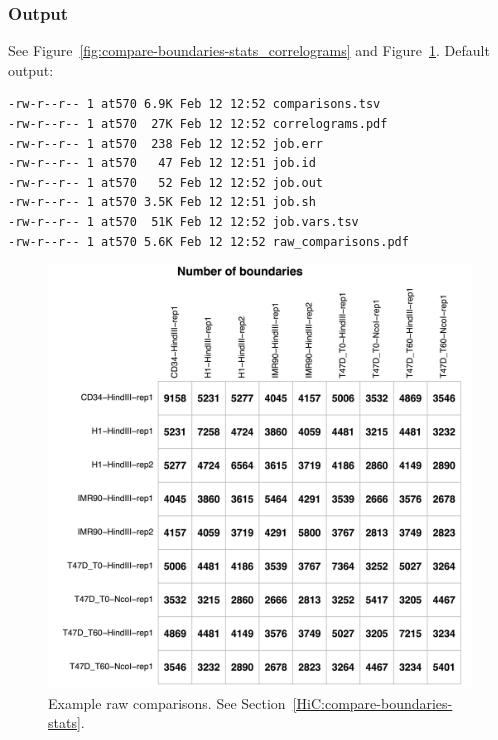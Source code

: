 \subsubsection{Output} %
See Figure~\ref{fig:compare-boundaries-stats_correlograms} and Figure~\ref{fig:compare-boundaries-stats_raw_comparisons}. Default output:
\begin{lstlisting}
-rw-r--r-- 1 at570 6.9K Feb 12 12:52 comparisons.tsv
-rw-r--r-- 1 at570  27K Feb 12 12:52 correlograms.pdf
-rw-r--r-- 1 at570  238 Feb 12 12:52 job.err
-rw-r--r-- 1 at570   47 Feb 12 12:51 job.id
-rw-r--r-- 1 at570   52 Feb 12 12:52 job.out
-rw-r--r-- 1 at570 3.5K Feb 12 12:51 job.sh
-rw-r--r-- 1 at570  51K Feb 12 12:52 job.vars.tsv
-rw-r--r-- 1 at570 5.6K Feb 12 12:52 raw_comparisons.pdf
\end{lstlisting}
\begin{figure}[!htb]
    \centering
    \includegraphics[width=\textwidth,height=\textheight,keepaspectratio]{figure/compare-boundaries-stats_raw_comparisons}
    \caption{Example raw comparisons. See Section~\ref{HiC:compare-boundaries-stats}.} %
    \label{fig:compare-boundaries-stats_raw_comparisons}
\end{figure}

